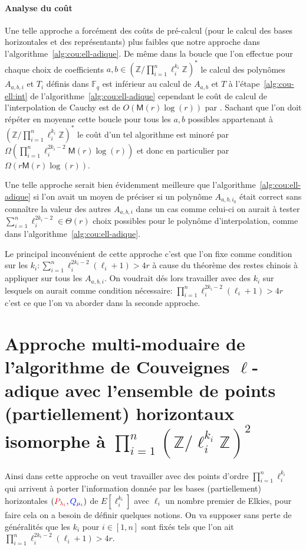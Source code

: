 \documentclass[10pt,a4paper]{book}
\theoremstyle{plain}
\theoremstyle{definition}
\theoremstyle{definition}
\theoremstyle{definition}
\theoremstyle{definition}
\theoremstyle{remark}
\theoremstyle{remark}
\theoremstyle{definition}
\begin{document}
\paragraph{Analyse du coût}
{Une telle approche a forcément des coûts de pré-calcul (pour le calcul des bases 
horizontales et des représentants) plus faibles que notre approche dans 
l'algorithme~\ref{alg:cou:ell-adique}. De même dans la boucle que l'on effectue
 pour chaque choix de coefficients $a,b \in (\mathbb{Z}/\prod_{i=1}^n\ell_i^{k_i} \mathbb{Z})^*$
le calcul des polynômes $A_{a,b,i}$ et $T_i$ définis dans $\mathbb{F}_q$ est 
inférieur au calcul de $A_{a,b}$ et $T$ à l'étape~\ref{alg:cou-ell:int} de 
l'algorithme~\ref{alg:cou:ell-adique} cependant le coût de calcul de 
l'interpolation de Cauchy  est de $O(\mathsf{M}(r)\log(r))$ par
 \cite[Théorème 7.5]{algeff17}. Sachant que l'on doit répéter en moyenne cette 
boucle pour tous les $a,b$ possibles appartenant à $(\mathbb{Z}/\prod_{i=1}^n\ell_i^{k_i} \mathbb{Z})^*$
 le coût d'un tel algorithme est minoré par $\Omega(\prod_{i=1}^n\ell_i^{2k_i-2}
 \mathsf{M}(r)\log(r))$ et donc en particulier par $\Omega(r\mathsf{M}(r)
 \log(r))$. 

Une telle approche serait bien évidemment meilleure que 
l'algorithme~\ref{alg:cou:ell-adique} si l'on avait un moyen de préciser si un 
polynôme $A_{a,b,i_0}$ était correct sans connaître la valeur des autres 
$A_{a,b,i}$ dans un cas comme celui-ci on aurait à tester 
$\sum_{i=1}^n \ell_i^{2k_i-2} \in \Theta(r)$ choix possibles pour le polynôme 
d'interpolation, comme dans l'algorithme~\ref{alg:cou:ell-adique}.

Le principal inconvénient de cette approche 
c'est que l'on fixe comme condition sur les $k_i: \sum_{i=1}^n\ell_i^{2k_{i}-2}(\ell_i+1)>4r$
à cause du théorème des restes chinois à appliquer sur tous les $A_{a,b,i}$. 
On voudrait dés lors travailler avec des $k_i$ sur lesquels on aurait comme 
condition nécessaire: $\prod_{i=1}^n\ell_i^{2k_{i}-2}(\ell_i+1)>4r$
c'est ce que l'on va aborder dans la seconde approche.}

\section{Approche multi-moduaire de l'algorithme de Couveignes $\ell$-adique avec l'ensemble de points (partiellement) horizontaux isomorphe à $\prod_{i=1}^n \left( \mathbb{Z}/\ell_i^{k_i} \mathbb{Z} \right)^{2}$}
Ainsi dans cette approche on veut travailler avec des points d'ordre 
$\prod_{i=1}^{n} \ell_i^{k_i}$ qui arrivent à porter l'information donnée par 
les  bases (partiellement) horizontales 
$(\color{red}P_{\lambda_i}\color{black},\color{blue}Q_{\mu_i}\color{black})$ de 
$E[\ell_i^{k_i}]$ avec $\ell_i$ un nombre premier de Elkies, pour faire cela on
a besoin de définir quelques notions. On
va supposer sans perte de généralités que les $k_i$ pour $i \in [1,n]$ sont 
fixés tels que l'on ait $\prod_{i=1}^{n} \ell_i^{2k_i-2}(\ell_i+1)>4r$.
\end{document}
